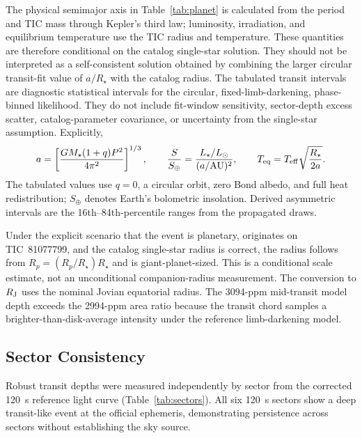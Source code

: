\documentclass[11pt]{article}
\begin{document}
The physical semimajor axis in Table~\ref{tab:planet} is calculated from the
period and TIC mass through Kepler's third law; luminosity, irradiation, and
equilibrium temperature use the TIC radius and temperature.  These quantities
are therefore conditional on the catalog single-star solution.  They should
not be interpreted as a self-consistent solution obtained by combining the
larger circular transit-fit value of $a/R_\star$ with the catalog radius.
The tabulated transit intervals are diagnostic statistical intervals for the
circular, fixed-limb-darkening, phase-binned likelihood.  They do not
include fit-window sensitivity, sector-depth excess scatter, catalog-parameter
covariance, or uncertainty from the single-star assumption.
Explicitly,
\[
a=\left[\frac{G M_\star(1+q)P^2}{4\pi^2}\right]^{1/3},\qquad
\frac{S}{S_\oplus}=\frac{L_\star/L_\odot}{(a/\mathrm{AU})^2},\qquad
T_{\rm eq}=T_{\rm eff}\sqrt{\frac{R_\star}{2a}}.
\]
The tabulated values use $q=0$, a circular orbit, zero Bond albedo, and full heat redistribution;
$S_\oplus$ denotes Earth's bolometric insolation.  Derived asymmetric intervals
are the 16th--84th-percentile ranges from the propagated draws.

Under the explicit scenario that the event is planetary, originates on
TIC~81077799, and the catalog single-star radius is correct, the radius follows
from $R_p=(R_p/R_\star)R_\star$ and is giant-planet-sized.  This is a
conditional scale estimate, not an unconditional companion-radius measurement.
The conversion to $R_{\rm J}$ uses the nominal Jovian equatorial radius.
The 3094-ppm mid-transit model depth exceeds the 2994-ppm area ratio because
the transit chord samples a brighter-than-disk-average intensity under the
  reference limb-darkening model.

\subsection{Sector Consistency}

Robust transit depths were measured independently by sector from the corrected
120~s reference light curve (Table~\ref{tab:sectors}).  All six 120~s
sectors show a deep transit-like event at the official ephemeris, demonstrating
persistence across sectors without establishing the sky source.
\end{document}
